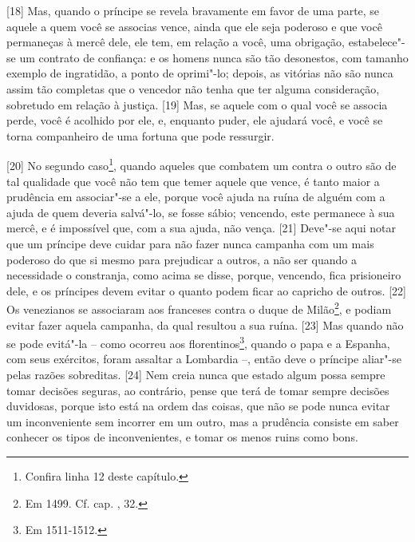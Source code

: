 {[}18{]} Mas, quando o príncipe se revela bravamente em favor de uma
parte, se aquele a quem você se associas vence, ainda que ele seja
poderoso e que você permaneças à mercê dele, ele tem, em relação a você,
uma obrigação, estabelece"-se um contrato de confiança: e os homens nunca
são tão desonestos, com tamanho exemplo de ingratidão, a ponto de
oprimi"-lo; depois, as vitórias não são nunca assim tão completas que o
vencedor não tenha que ter alguma consideração, sobretudo em relação à
justiça. {[}19{]} Mas, se aquele com o qual você se associa perde, você
é acolhido por ele, e, enquanto puder, ele ajudará você, e você se torna
companheiro de uma fortuna que pode ressurgir.

{[}20{]} No segundo caso\footnote{Confira linha 12 deste capítulo.},
quando aqueles que combatem um contra o outro são de tal qualidade que
você não tem que temer aquele que vence, é tanto maior a prudência em
associar"-se a ele, porque você ajuda na ruína de alguém com a ajuda de
quem deveria salvá"-lo, se fosse sábio; vencendo, este permanece à sua
mercê, e é impossível que, com a sua ajuda, não vença. {[}21{]} Deve"-se
aqui notar que um príncipe deve cuidar para não fazer nunca campanha com
um mais poderoso do que si mesmo para prejudicar a outros, a não ser
quando a necessidade o constranja, como acima se disse, porque,
vencendo, fica prisioneiro dele, e os príncipes devem evitar o quanto
podem ficar ao capricho de outros. {[}22{]} Os venezianos se associaram
aos franceses contra o duque de Milão\footnote{Em 1499. Cf. cap. ,
  32.}, e podiam evitar fazer aquela campanha, da qual resultou a sua
ruína. {[}23{]} Mas quando não se pode evitá"-la -- como ocorreu aos
florentinos\footnote{Em 1511-1512.}, quando o papa e a Espanha, com seus
exércitos, foram assaltar a Lombardia --, então deve o príncipe aliar"-se
pelas razões sobreditas. {[}24{]} Nem creia nunca que estado algum possa
sempre tomar decisões seguras, ao contrário, pense que terá de tomar
sempre decisões duvidosas, porque isto está na ordem das coisas, que não
se pode nunca evitar um inconveniente sem incorrer em um outro, mas a
prudência consiste em saber conhecer os tipos de inconvenientes, e tomar
os menos ruins como bons.

